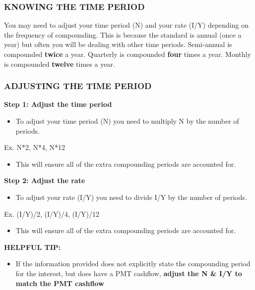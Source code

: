 \documentclass[12pt]{article}
\begin{document}
            \subsubsection{KNOWING THE TIME PERIOD}
                You may need to adjust your time period (N) and your rate (I/Y) depending on the frequency of compounding. This is because the standard
                is annual (once a year) but often you will be dealing with other time periods.
                \newline Semi-annual is compounded \textbf{twice} a year.
                \newline Quarterly is compounded \textbf{four} times a year.
                \newline Monthly is compounded \textbf{twelve} times a year.
            \subsubsection{ADJUSTING THE TIME PERIOD}
                \textbf{Step 1: Adjust the time period}
                \begin{itemize}
                    \item To adjust your time period (N) you need to multiply N by the number of periods.
                \end{itemize}
                Ex. N*2, N*4, N*12
                \begin{itemize}
                    \item This will ensure all of the extra compounding periods are accounted for.
                \end{itemize}
                \textbf{Step 2: Adjust the rate}
                \begin{itemize}
                    \item To adjust your rate (I/Y) you need to divide I/Y by the number of periods.
                \end{itemize}
                Ex. (I/Y)/2, (I/Y)/4, (I/Y)/12
                \begin{itemize}
                    \item This will ensure all of the extra compounding periods are accounted for.
                \end{itemize}
                \textbf{HELPFUL TIP:}
                \begin{itemize}
                    \item If the information provided does not explicitly state the compounding period for the interest, but does have a PMT cashflow,
                    \textbf{adjust the N \& I/Y to match the PMT cashflow}   
                \end{itemize}
\end{document}
